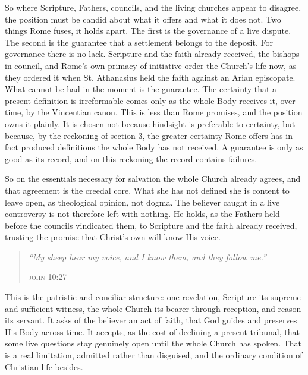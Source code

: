 \documentclass[11pt,twoside]{article}
\newenvironment{scripture}{\par\medskip\begin{quote}\color{subhead}}{\end{quote}\medskip}
\begin{document}
So where Scripture, Fathers, councils, and the living churches appear to disagree, the position must be candid about what it offers and what it does not. Two things Rome fuses, it holds apart. The first is the governance of a live dispute. The second is the guarantee that a settlement belongs to the deposit. For governance there is no lack. Scripture and the faith already received, the bishops in council, and Rome's own primacy of initiative order the Church's life now, as they ordered it when St. Athanasius held the faith against an Arian episcopate. What cannot be had in the moment is the guarantee. The certainty that a present definition is irreformable comes only as the whole Body receives it, over time, by the Vincentian canon. This is less than Rome promises, and the position owns it plainly. It is chosen not because hindsight is preferable to certainty, but because, by the reckoning of section 3, the greater certainty Rome offers has in fact produced definitions the whole Body has not received. A guarantee is only as good as its record, and on this reckoning the record contains failures.

So on the essentials necessary for salvation the whole Church already agrees, and that agreement is the creedal core. What she has not defined she is content to leave open, as theological opinion, not dogma. The believer caught in a live controversy is not therefore left with nothing. He holds, as the Fathers held before the councils vindicated them, to Scripture and the faith already received, trusting the promise that Christ's own will know His voice.

\begin{scripture}\emph{``My sheep hear my voice, and I know them, and they follow me.''}\par\hfill\textsc{john 10:27}\end{scripture}

This is the patristic and conciliar structure: one revelation, Scripture its supreme and sufficient witness, the whole Church its bearer through reception, and reason its servant. It asks of the believer an act of faith, that God guides and preserves His Body across time. It accepts, as the cost of declining a present tribunal, that some live questions stay genuinely open until the whole Church has spoken. That is a real limitation, admitted rather than disguised, and the ordinary condition of Christian life besides.
\end{document}
